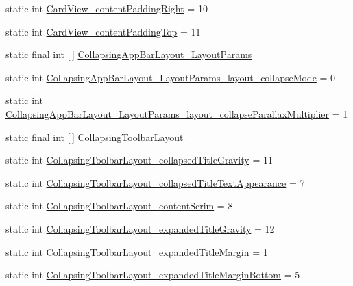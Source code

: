 \begin{DoxyCompactItemize}
\item 
static int \hyperlink{classandroid_1_1support_1_1v7_1_1cardview_1_1R_1_1styleable_a628bf5a056adce073b9e664d4a2f4d14}{Card\+View\+\_\+content\+Padding\+Right} = 10
\item 
static int \hyperlink{classandroid_1_1support_1_1v7_1_1cardview_1_1R_1_1styleable_a5027a3856e6f3bdd41006d07bbd06823}{Card\+View\+\_\+content\+Padding\+Top} = 11
\item 
static final int \mbox{[}$\,$\mbox{]} \hyperlink{classandroid_1_1support_1_1v7_1_1cardview_1_1R_1_1styleable_a16f17ad190df56abdfbfa11e42898369}{Collapsing\+App\+Bar\+Layout\+\_\+\+Layout\+Params}
\item 
static int \hyperlink{classandroid_1_1support_1_1v7_1_1cardview_1_1R_1_1styleable_a96f22ebb139de6418b43c78b653af717}{Collapsing\+App\+Bar\+Layout\+\_\+\+Layout\+Params\+\_\+layout\+\_\+collapse\+Mode} = 0
\item 
static int \hyperlink{classandroid_1_1support_1_1v7_1_1cardview_1_1R_1_1styleable_a9a9ccaf5bc1abaffc694f48a3f2504d3}{Collapsing\+App\+Bar\+Layout\+\_\+\+Layout\+Params\+\_\+layout\+\_\+collapse\+Parallax\+Multiplier} = 1
\item 
static final int \mbox{[}$\,$\mbox{]} \hyperlink{classandroid_1_1support_1_1v7_1_1cardview_1_1R_1_1styleable_a3b4c5393d0c99cb4e5a7a3911fc606b4}{Collapsing\+Toolbar\+Layout}
\item 
static int \hyperlink{classandroid_1_1support_1_1v7_1_1cardview_1_1R_1_1styleable_aca98ea1812eddbb1cc47a7e5900bd6ac}{Collapsing\+Toolbar\+Layout\+\_\+collapsed\+Title\+Gravity} = 11
\item 
static int \hyperlink{classandroid_1_1support_1_1v7_1_1cardview_1_1R_1_1styleable_ad3a48e5593ffa8db03af733e76a429f2}{Collapsing\+Toolbar\+Layout\+\_\+collapsed\+Title\+Text\+Appearance} = 7
\item 
static int \hyperlink{classandroid_1_1support_1_1v7_1_1cardview_1_1R_1_1styleable_a4788b65165005d22b0fc4665a27806a3}{Collapsing\+Toolbar\+Layout\+\_\+content\+Scrim} = 8
\item 
static int \hyperlink{classandroid_1_1support_1_1v7_1_1cardview_1_1R_1_1styleable_aea2383ec907327db77221d2a33d06306}{Collapsing\+Toolbar\+Layout\+\_\+expanded\+Title\+Gravity} = 12
\item 
static int \hyperlink{classandroid_1_1support_1_1v7_1_1cardview_1_1R_1_1styleable_af7f7bf893630b5286fdcaec73cb489c5}{Collapsing\+Toolbar\+Layout\+\_\+expanded\+Title\+Margin} = 1
\item 
static int \hyperlink{classandroid_1_1support_1_1v7_1_1cardview_1_1R_1_1styleable_ad9b7a75fc3bd07996d8b38480cb5e7a2}{Collapsing\+Toolbar\+Layout\+\_\+expanded\+Title\+Margin\+Bottom} = 5

\end{DoxyCompactItemize}
